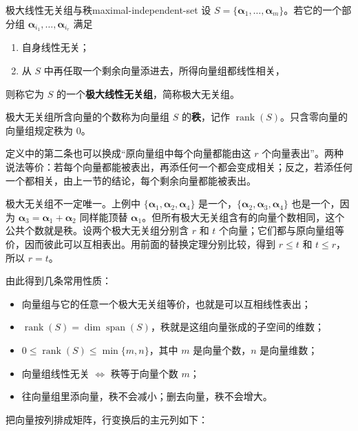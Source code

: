\begin{mydef}{极大线性无关组与秩}{maximal-independent-set}
设 $S=\{\boldsymbol{\alpha}_1,\ldots,\boldsymbol{\alpha}_m\}$。若它的一个部分组 $\boldsymbol{\alpha}_{i_1},\ldots,\boldsymbol{\alpha}_{i_r}$ 满足
\begin{enumerate}
  \item 自身线性无关；
  \item 从 $S$ 中再任取一个剩余向量添进去，所得向量组都线性相关，
\end{enumerate}
则称它为 $S$ 的一个\textbf{极大线性无关组}，简称极大无关组。

极大无关组所含向量的个数称为向量组 $S$ 的\textbf{秩}，记作 $\operatorname{rank}(S)$。只含零向量的向量组规定秩为 $0$。
\end{mydef}

定义中的第二条也可以换成“原向量组中每个向量都能由这 $r$ 个向量表出”。两种说法等价：若每个向量都能被表出，再添任何一个都会变成相关；反之，若添任何一个都相关，由上一节的结论，每个剩余向量都能被表出。

极大无关组不一定唯一。上例中 $\{\boldsymbol{\alpha}_1,\boldsymbol{\alpha}_2,\boldsymbol{\alpha}_4\}$ 是一个，$\{\boldsymbol{\alpha}_2,\boldsymbol{\alpha}_3,\boldsymbol{\alpha}_4\}$ 也是一个，因为 $\boldsymbol{\alpha}_3=\boldsymbol{\alpha}_1+\boldsymbol{\alpha}_2$ 同样能顶替 $\boldsymbol{\alpha}_1$。但所有极大无关组含有的向量个数相同，这个公共个数就是秩。设两个极大无关组分别含 $r$ 和 $t$ 个向量；它们都与原向量组等价，因而彼此可以互相表出。用前面的替换定理分别比较，得到 $r\le t$ 和 $t\le r$，所以 $r=t$。

由此得到几条常用性质：
\begin{itemize}
  \item 向量组与它的任意一个极大无关组等价，也就是可以互相线性表出；
  \item $\operatorname{rank}(S)=\dim\operatorname{span}(S)$，秩就是这组向量张成的子空间的维数；
  \item $0\le \operatorname{rank}(S)\le \min\{m,n\}$，其中 $m$ 是向量个数，$n$ 是向量维数；
  \item 向量组线性无关 $\iff$ 秩等于向量个数 $m$；
  \item 往向量组里添向量，秩不会减小；删去向量，秩不会增大。
\end{itemize}

把向量按列排成矩阵，行变换后的主元列如下：

